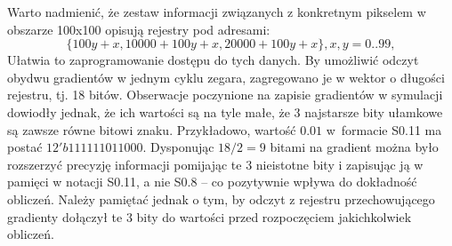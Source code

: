 Warto nadmienić, że zestaw informacji związanych z konkretnym pikselem w obszarze 100x100 opisują rejestry pod adresami:
\begin{equation}
\{100y+x, 10000+100y+x, 20000+100y+x\}, x,y=0..99,
\end{equation}
Ułatwia to zaprogramowanie dostępu do tych danych. 
By umożliwić odczyt obydwu gradientów w jednym cyklu zegara, zagregowano je w wektor o długości rejestru, tj. 18 bitów. 
Obserwacje poczynione na zapisie gradientów w symulacji dowiodły jednak, że ich wartości są na tyle małe, że 3 najstarsze bity ułamkowe są zawsze równe bitowi znaku. 
Przykładowo, wartość $0.01$ w~formacie S0.11 ma postać $12'b111111011000$. 
Dysponując $18/2=9$ bitami na gradient można było rozszerzyć precyzję informacji pomijając te 3 nieistotne bity i zapisując ją w pamięci w notacji S0.11, a nie S0.8 -- co pozytywnie wpływa do dokładność obliczeń. 
Należy pamiętać jednak o tym, by odczyt z rejestru przechowującego gradienty dołączył te 3 bity do wartości przed rozpoczęciem jakichkolwiek obliczeń.

